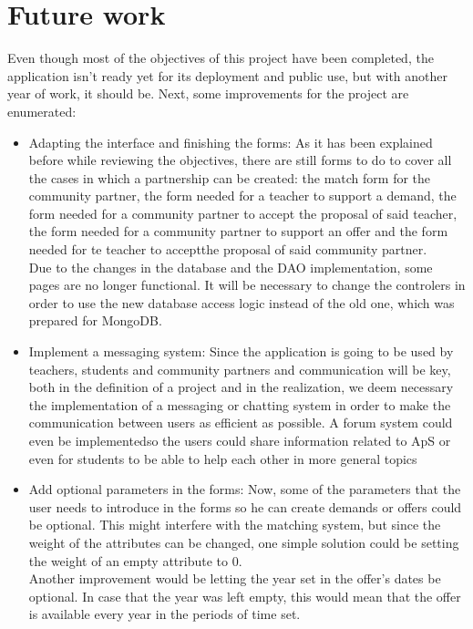 \documentclass[11pt]{book}
\begin{document}
\section{Future work}
Even though most of the objectives of this project have been completed, the application isn't ready yet for its deployment and public use, but with another year of work, it should be. Next, some improvements for the project are enumerated:
\begin{itemize}
	\item Adapting the interface and finishing the forms: As it has been explained before while reviewing the objectives, there are still forms to do to cover all the cases in which a partnership can be created: the match form for the community partner, the form needed for a teacher to support a demand, the form needed for a community partner to accept the proposal of said teacher, the form needed for a community partner to support an offer and the form needed for te teacher to acceptthe proposal of said community partner.\\
Due to the changes in the database and the DAO implementation, some pages are no longer functional. It will be necessary to change the controlers in order to use the new database access logic instead of the old one, which was prepared for MongoDB.
	\item Implement a messaging system: Since the application is going to be used by teachers, students and community partners and communication will be key, both in the definition of a project and in the realization, we deem necessary the implementation of a messaging or chatting system in order to make the communication between users as efficient as possible. A forum system could even be implementedso the users could share information related to ApS or even for students to be able to help each other in more general topics
	\item Add optional parameters in the forms: Now, some of the parameters that the user needs to introduce in the forms so he can create demands or offers could be optional. This might interfere with the matching system, but since the weight of the attributes can be changed, one simple solution could be setting the weight of an empty attribute to 0. \\
Another improvement would be letting the year set in the offer's dates be optional. In case that the year was left empty, this would mean that the offer is available every year in the periods of time set.
\end{itemize}

\end{document}
